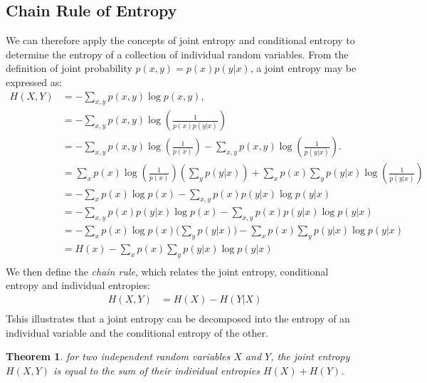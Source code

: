 \documentclass[12pt]{article}
\newtheorem{theorem}{Theorem}
\begin{document}
		\subsection{Chain Rule of Entropy}
		We can therefore apply the concepts of joint entropy and conditional entropy to determine the entropy of a collection of individual random variables. %
		From the definition of joint probability \( p(x, y) = p(x) p(y|x) \), a joint entropy may be expressed as:
		\begin{align}
			H(X, Y) & = -\sum_{x, y} p(x, y) \log p(x, y), \\
			&= -\sum_{x, y} p(x, y) \log \left(\frac{1}{p(x)p(y|x)}\right) \\
			&= -\sum_{x, y} p(x, y) \log \left(\frac{1}{p(x)}\right) - \sum_{x, y} p(x, y) \log \left(\frac{1}{p(y|x)}\right).\\
			&= \sum_{x} p(x) \log \left(\frac{1}{p(x)}\right) \left(\sum_{y} p(y|x)\right) + \sum_{x} p(x) \sum_{y} p(y|x) \log \left(\frac{1}{p(y|x)}\right) \\
			& = -\sum_{x} p(x) \log p(x) - \sum_{x,y} p(x) p(y|x) \log p(y|x) \\
			& = -\sum_{x,y} p(x) p(y|x) \log p(x) - \sum_{x,y} p(x) p(y|x) \log p(y|x) \\
			& = -\sum_{x} p(x)  \log p(x) \Biggr( \sum_{y}  p(y|x)  \Biggr) - \sum_{x} p(x)  \sum_{y}  p(y|x)   \log p(y|x) \\
			& =H(x) - \sum_{x} p(x)  \sum_{y}  p(y|x)   \log p(y|x) \\
		\end{align}
		We then define the \emph{chain rule}, which relates the joint entropy, conditional entropy and individual entropies:
		\begin{equation}
			\begin{split}
				H(X, Y) 
				& =  H(X) - H(Y|X) \\
			\end{split}
		\end{equation}
		Tshis illustrates that a joint entropy can be decomposed into the entropy of an individual variable and the conditional entropy of the other.
		\begin{theorem}
			for two independent random variables \(X\) and \(Y\), the joint entropy \(H(X, Y)\) is equal to the sum of their individual entropies \(H(X) + H(Y)\).
		\end{theorem}
\end{document}
